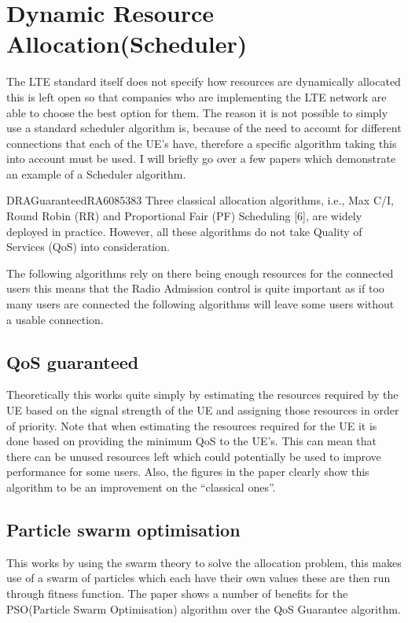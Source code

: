 \section{Dynamic Resource Allocation(Scheduler)}
{
	The LTE standard itself does not specify how resources are dynamically allocated this is left open so that companies who are implementing the LTE network are able to choose the best option for them. The reason it is not possible to simply use a standard scheduler algorithm is, because of the need to account for different connections that each of the UE's have, therefore a specific algorithm taking this into account must be used. I will briefly go over a few papers which demonstrate an example of a Scheduler algorithm.
	\begin{displaycquote}{DRAGuaranteedRA6085383}
		Three classical allocation algorithms, i.e., Max C/I, Round Robin (RR) and Proportional Fair (PF) Scheduling [6], are widely deployed in practice. However, all these algorithms do not take Quality of Services (QoS) into consideration.
	\end{displaycquote}
	The following algorithms rely on there being enough resources for the connected users this means that the Radio Admission control is quite important as if too many users are connected the following algorithms will leave some users without a usable connection.
	\subsection{QoS guaranteed \cite{DRAGuaranteedRA6085383}}
	{
		Theoretically this works quite simply by estimating the resources required by the UE based on the signal strength of the UE and assigning those resources in order of priority. Note that when estimating the resources required for the UE it is done based on providing the minimum QoS to the UE's. This can mean that there can be unused resources left which could potentially be used to improve performance for some users. Also, the figures in the paper clearly show this algorithm to be an improvement on the \enquote{classical ones}.
	}

	\subsection{Particle swarm optimisation \cite{DRASwarm6388227}}
	{
		This works by using the swarm theory to solve the allocation problem, this makes use of a swarm of particles which each have their own values these are then run through fitness function. The paper shows a number of benefits for the PSO(Particle Swarm Optimisation) algorithm over the QoS Guarantee algorithm.
	}

}
